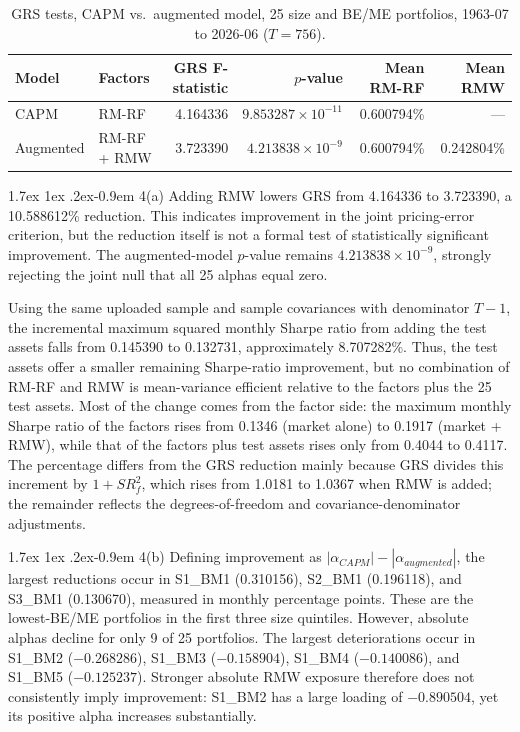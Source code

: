 \documentclass[11pt]{article}
\makeatletter
\renewcommand\paragraph{\@startsection{paragraph}{4}{0pt}%
  {1.7ex \@plus 1ex \@minus .2ex}{-0.9em}%
  {\normalfont\bfseries\normalsize\color{psink}}}
\makeatother
\begin{document}
\begin{table}[H]
\centering
\caption{GRS tests, CAPM vs.\ augmented model, 25 size and BE/ME portfolios,
1963-07 to 2026-06 ($T = 756$).}
\small
\begin{tabular}{llrrrr}
\toprule
Model & Factors & GRS F-statistic & $p$-value & Mean RM-RF & Mean RMW \\
\midrule
CAPM & RM-RF & 4.164336 & $9.853287\times10^{-11}$ & 0.600794\% & --- \\
Augmented & RM-RF + RMW & 3.723390 & $4.213838\times10^{-9}$ & 0.600794\% & 0.242804\% \\
\bottomrule
\end{tabular}
\label{tab:cap_grs}
\end{table}

\paragraph{4(a)} Adding RMW lowers GRS from 4.164336 to 3.723390, a
10.588612\% reduction. This indicates improvement in the joint pricing-error
criterion, but the reduction itself is not a formal test of statistically
significant improvement. The augmented-model $p$-value remains
$4.213838\times10^{-9}$, strongly rejecting the joint null that all 25 alphas
equal zero.

Using the same uploaded sample and sample covariances with denominator
$T-1$, the incremental maximum squared monthly Sharpe ratio from adding the
test assets falls from 0.145390 to 0.132731, approximately 8.707282\%. Thus,
the test assets offer a smaller remaining Sharpe-ratio improvement, but no
combination of RM-RF and RMW is mean-variance efficient relative to the
factors plus the 25 test assets. Most of the change comes from the factor
side: the maximum monthly Sharpe ratio of the factors rises from 0.1346
(market alone) to 0.1917 (market + RMW), while that of the factors plus test
assets rises only from 0.4044 to 0.4117. The percentage differs from the GRS
reduction mainly because GRS divides this increment by $1+SR_f^2$, which
rises from 1.0181 to 1.0367 when RMW is added; the remainder reflects the
degrees-of-freedom and covariance-denominator adjustments.

\paragraph{4(b)} Defining improvement as
$|\alpha_{CAPM}|-|\alpha_{augmented}|$, the largest reductions occur in
S1\_BM1 (0.310156), S2\_BM1 (0.196118), and S3\_BM1 (0.130670), measured in
monthly percentage points. These are the lowest-BE/ME portfolios in the first
three size quintiles. However, absolute alphas decline for only 9 of 25
portfolios. The largest deteriorations occur in S1\_BM2 ($-0.268286$),
S1\_BM3 ($-0.158904$), S1\_BM4 ($-0.140086$), and S1\_BM5 ($-0.125237$).
Stronger absolute RMW exposure therefore does not consistently imply
improvement: S1\_BM2 has a large loading of $-0.890504$, yet its positive
alpha increases substantially.
\end{document}
